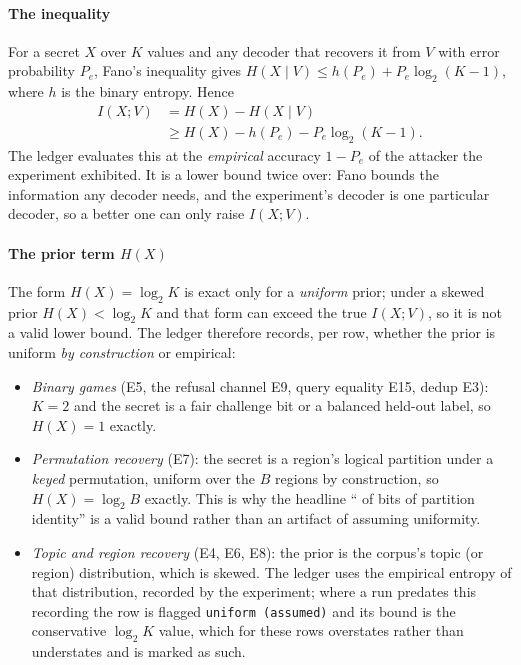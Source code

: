 \documentclass[10pt,journal,compsoc]{IEEEtran}
\begin{document}
\paragraph{The inequality} For a secret $X$ over $K$ values and any decoder that recovers it from
$V$ with error probability $P_e$, Fano's inequality gives
$H(X\mid V) \le h(P_e) + P_e\log_2(K-1)$, where $h$ is the binary entropy. Hence
\begin{align*}
I(X;V) &= H(X) - H(X\mid V)\\
       &\ge H(X) - h(P_e) - P_e\log_2(K-1).
\end{align*}
The ledger evaluates this at the \emph{empirical} accuracy $1-P_e$ of the attacker the experiment
exhibited. It is a lower bound twice over: Fano bounds the information any decoder needs, and the
experiment's decoder is one particular decoder, so a better one can only raise $I(X;V)$.

\paragraph{The prior term $H(X)$} The form $H(X)=\log_2 K$ is exact only for a \emph{uniform}
prior; under a skewed prior $H(X)<\log_2 K$ and that form can exceed the true $I(X;V)$, so it is not
a valid lower bound. The ledger therefore records, per row, whether the prior is uniform \emph{by
construction} or empirical:
\begin{itemize}
\item \emph{Binary games} (E5, the refusal channel E9, query equality E15, dedup E3): $K=2$ and the
secret is a fair challenge bit or a balanced held-out label, so $H(X)=1$ exactly.
\item \emph{Permutation recovery} (E7): the secret is a region's logical partition under a
\emph{keyed} permutation, uniform over the $B$ regions by construction, so $H(X)=\log_2 B$ exactly.
This is why the headline ``\RLedgerPermBits{} of \RLedgerPermBitsMax{} bits of partition identity''
is a valid bound rather than an artifact of assuming uniformity.
\item \emph{Topic and region recovery} (E4, E6, E8): the prior is the corpus's topic (or region)
distribution, which is skewed. The ledger uses the empirical entropy of that distribution, recorded
by the experiment; where a run predates this recording the row is flagged
\texttt{uniform (assumed)} and its bound is the conservative $\log_2 K$ value, which for these rows
overstates rather than understates and is marked as such.
\end{itemize}
\end{document}
